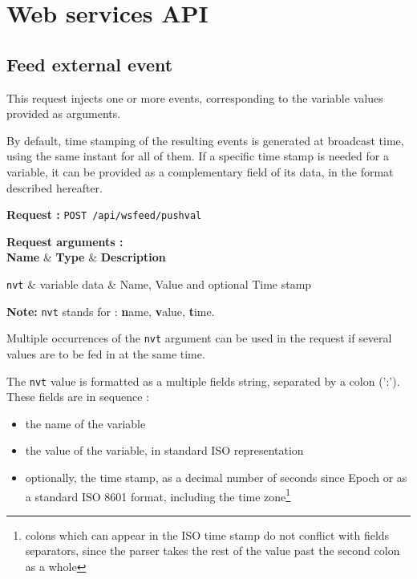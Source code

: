 \documentclass[11pt,a4paper]{article}
\newcommand{\apireq}[2]{\vspace{1em}\textbf{Request : }\texttt{#1~#2}}
\newcommand{\reqenvwidth}{\textwidth}
\newenvironment{reqargs} { %
	\vspace{1em}\textbf{Request arguments : }\hfill\\ %
	\tabularx{\reqenvwidth}{llX} %
	\textbf{Name} & \textbf{Type} & \textbf{Description}\\ %
	\midrule %
}{ %
	\endtabularx %
}
\newcommand{\reqarg}[3]{\texttt{#1} & #2 & #3 \\}
\begin{document}
\section{Web services API}

\subsection{Feed external event}

This request injects one or more events, corresponding to the variable values provided as 
arguments. 

By default, time stamping of the resulting events is generated at broadcast time, using the 
same instant for all of them. If a specific time stamp is needed for a variable, it can be 
provided as a complementary field of its data, in the format described hereafter.

\apireq{POST}{/api/wsfeed/pushval}

\begin{reqargs}
\reqarg{nvt}{variable data}{Name, Value and optional Time stamp}
\end{reqargs}

\textbf{Note:} \texttt{nvt} stands for : \textbf{n}ame, \textbf{v}alue, \textbf{t}ime.

Multiple occurrences of the \texttt{nvt} argument can be used in the request if several 
values are to be fed in at the same time.

The \texttt{nvt} value is formatted as a multiple fields string, separated by a colon (':'). 
These fields are in sequence :
\begin{itemize}
\item the name of the variable 
\item the value of the variable, in standard ISO representation
\item optionally, the time stamp, as a decimal number of seconds since Epoch or as a 
standard ISO 8601 format, including the time zone\footnote{colons which can appear in the 
ISO time stamp do not conflict with fields separators, since the parser takes the rest of 
the value past the second colon as a whole}
\end{itemize}
\end{document}
